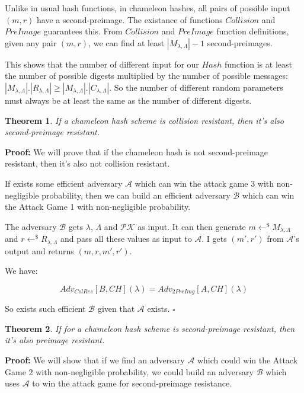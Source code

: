 \documentclass[a4paper]{article}
\newtheorem{theorem}{Theorem}
\newcommand*{\qed}{\hfill\ensuremath{\square}}
\begin{document}
 Unlike in usual hash functions, in chameleon hashes, all pairs
 of possible input $(m, r)$ have a second-preimage. The existance 
 of functions $Collision$ and $PreImage$ guarantees this. From 
 $Collision$ and $PreImage$ function definitions,
 given any pair $(m, r)$, we can find at least $|M_{\lambda,\Lambda}|-1$
 second-preimages.
 
 This shows that the number of different input for our $Hash$ function
 is at least the number of possible digests multiplied by the number
 of possible messages: $|M_{\lambda,\Lambda}|.|R_{\lambda,\Lambda}|
 \geq |M_{\lambda,\Lambda}|.|C_{\lambda,\Lambda}|$. So the number
 of different random parameters must always be at least the same as the
 number of different digests.
 
 \begin{theorem}
 If a chameleon hash scheme is collision resistant, then it's also
 second-preimage resistant.
 \end{theorem}
 
 \textbf{Proof:} We will prove that if the chameleon hash is not
 second-preimage resistant, then it's also not collision resistant.
 
 If exists some efficient adversary $\mathcal{A}$ which can win the
 attack game 3 with non-negligible probability, then we can build an
 efficient adversary $\mathcal{B}$ which can win the Attack Game 1 with
 non-negligible probability.
 
 The adversary $\mathcal{B}$ gets $\lambda$, $\Lambda$ and 
 $\mathcal{PK}$ as input. It can then generate 
 $m \leftarrow^{\$}M_{\lambda, \Lambda}$ and 
 $r \leftarrow^{\$}R_{\lambda,\Lambda}$
 and pass all these values as input to $\mathcal{A}$. I gets $(m', r')$
 from $\mathcal{A}$'s output and returns $(m, r, m', r')$.
 
 We have:
 
 $$
 Adv_{ColRes}[B, CH](\lambda) = Adv_{2PreImg}[A, CH](\lambda)
 $$
 
 So exists such efficient $\mathcal{B}$ given that $\mathcal{A}$ exists.
 \qed
 
 \begin{theorem}
 If for a chameleon hash scheme is second-preimage resistant, then 
 it's also preimage resistant.
 \end{theorem}
 
 \textbf{Proof:} We will show that if we find an adversary $\mathcal{A}$
 which could win the Attack Game 2 with non-negligible probability,
 we could build an adversary $\mathcal{B}$ which uses $\mathcal{A}$
 to win the attack game for second-preimage resistance.
 
\end{document}

